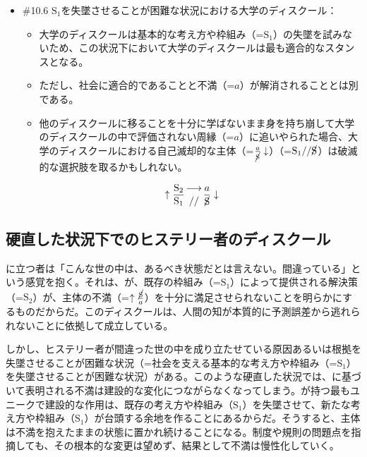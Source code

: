 \begin{note}{}
  \begin{itemize}
    \tightlist
    \item{\#10.6} $\textrm{S}_1$を失墜させることが困難な状況における大学のディスクール：
      \begin{itemize}
        \tightlist
        \item 大学のディスクールは基本的な考え方や枠組み（=$\textrm{S}_1$）の失墜を試みないため、この状況下において大学のディスクールは最も適合的なスタンスとなる。
        \item ただし、社会に適合的であることと不満（=$a$）が解消されることとは別である。
        \item 他のディスクールに移ることを十分に学ばないまま身を持ち崩して大学のディスクールの中で評価されない周縁（=$a$）に追いやられた場合、大学のディスクールにおける自己滅却的な主体（=$\frac{a}{\cancel{\textrm{S}}}\downarrow$）（=$\textrm{S}_1//\cancel{\textrm{S}}$）は破滅的な選択肢を取るかもしれない。
      \end{itemize}

$$
\uparrow\frac{\mathrm{S_2}}{\mathrm{S_1}}\genfrac{}{}{0pt}{}{\longrightarrow}{//}\frac{a}{\cancel{\textrm{S}}}\downarrow
$$
  \end{itemize}
\end{note}

\subsection{硬直した状況下でのヒステリー者のディスクール}\label{ux786cux76f4ux3057ux305fux72b6ux6cc1ux4e0bux3067ux306eux30d2ux30b9ux30c6ux30eaux30fcux8005ux306eux30c7ux30a3ux30b9ux30afux30fcux30eb}

に立つ者は「こんな世の中は、あるべき状態だとは言えない。間違っている」という感覚を抱く。それは、が、既存の枠組み（=\(\textrm{S}_1\)）によって提供される解決策（=\(\textrm{S}_2\)）が、主体の不満（=\(\uparrow\frac{\cancel{\textrm{S}}}{a}\)）を十分に満足させられないことを明らかにするものだからだ。このディスクールは、人間の知が本質的に予測誤差から逃れられないことに依拠して成立している。

しかし、ヒステリー者が間違った世の中を成り立たせている原因あるいは根拠を失墜させることが困難な状況（=社会を支える基本的な考え方や枠組み（=\(\textrm{S}_1\)）を失墜させることが困難な状況）がある。このような硬直した状況では、に基づいて表明される不満は建設的な変化につながらなくなってしまう。が持つ最もユニークで建設的な作用は、既存の考え方や枠組み（\(\textrm{S}_1\)）を失墜させて、新たな考え方や枠組み（\(\textrm{S}_1\)）が台頭する余地を作ることにあるからだ。そうすると、主体は不満を抱えたままの状態に置かれ続けることになる。制度や規則の問題点を指摘しても、その根本的な変更は望めず、結果として不満は慢性化していく。

